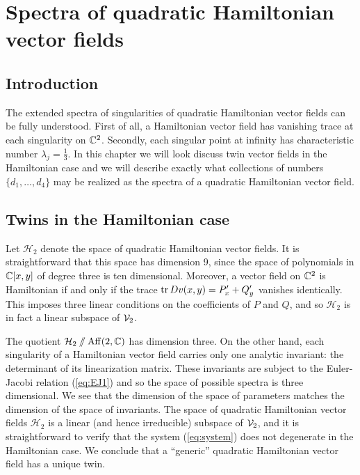 \documentclass[phd,tocprelim]{cornell}
\begin{document}
\appendix
\chapter{Spectra of quadratic Hamiltonian vector fields}\label{chpt:appendix:Hamiltonian}

\section{Introduction}

The extended spectra of singularities of quadratic Hamiltonian vector fields can be fully understood. First of all, a Hamiltonian vector field has vanishing trace at each singularity on $\mathbb{C}^2$. Secondly, each singular point at infinity has characteristic number $\lambda_j=\frac{1}{3}$. In this chapter we will look discuss twin vector fields in the Hamiltonian case and we will describe exactly what collections of numbers $\{d_1,\ldots,d_4\}$ may be realized as the spectra of a quadratic Hamiltonian vector field.




\section{Twins in the Hamiltonian case}

Let $\mathcal{H}_2$ denote the space of quadratic Hamiltonian vector fields. It is straightforward that this space has dimension 9, since the space of polynomials in $\mathbb{C}[x,y]$ of degree three is ten dimensional. Moreover, a vector field on $\mathbb{C}^2$ is Hamiltonian if and only if the trace $\operatorname{tr}{Dv(x,y)}=P'_x+Q'_y$ vanishes identically. This imposes three linear conditions on the coefficients of $P$ and $Q$, and so $\mathcal{H}_2$ is in fact a linear subspace of $\mathcal{V}_2$.


The quotient $\mathcal{H}_2\sslash\operatorname{Aff}({2},{\mathbb{C}})$ has dimension three. On the other hand, each singularity of a Hamiltonian vector field carries only one analytic invariant: the determinant of its linearization matrix. These invariants are subject to the Euler-Jacobi relation (\ref{eq:EJ1}) and so the space of possible spectra is three dimensional. We see that the dimension of the space of parameters matches the dimension of the space of invariants. The space of quadratic Hamiltonian vector fields $\mathcal{H}_2$ is a linear (and hence irreducible) subspace of $\mathcal{V}_2$, and it is straightforward to verify that the system (\ref{eq:system}) does not degenerate in the Hamiltonian case. We conclude that a ``generic'' quadratic Hamiltonian vector field has a unique twin.
\end{document}
